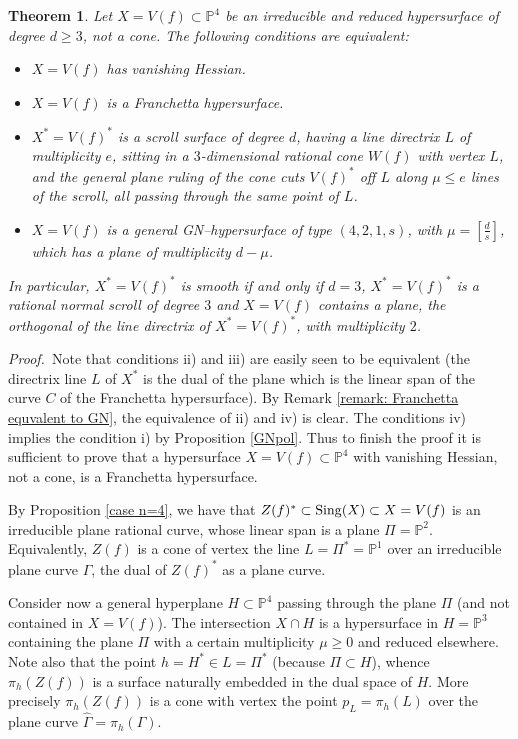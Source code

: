 \documentclass[11pt,a4paper]{amsart}
\newtheorem{theorem}{Theorem}[section]
\newcommand{\bprf}{{\it Proof.~}}
\begin{document}
\begin{theorem}\label{HGNF}
Let $X=V(f)\subset\mathbb{P}^4$ be an irreducible and reduced hypersurface of degree $d\geq 3$, not a cone.
The following conditions are equivalent:
\begin{itemize}
\item [{\rm i)}] $X=V(f)$ has vanishing Hessian. \item [{\rm ii)}]
$X=V(f)$ is a Franchetta hypersurface. \item [{\rm iii)}]
$X^*=V(f)^*$ is a scroll surface of degree $d$, having a line
directrix $L$ of multiplicity $e$, sitting in a $3$-dimensional
rational cone $W(f)$ with vertex $L$, and the general plane ruling
of the cone cuts $V(f)^*$ off $L$ along $\mu \leq e$ lines of the
scroll,  all passing through the same point of $L$. \item [{\rm
iv)}]  $X=V(f)$  is a general GN--hypersurface of type
$(4,2,1,s)$, with $\mu =[\frac{d}{s}]$, which has a plane of
multiplicity $d-\mu$.
\end{itemize}
In particular, $X^*=V(f)^*$ is smooth if and only if  $d=3$, $X^*=V(f)^*$ is a rational normal scroll of degree $3$ and $X=V(f)$ contains a plane, the orthogonal of the line directrix of $X^*=V(f)^*$, with multiplicity $2$.
\end{theorem}

\bprf Note that  conditions ii) and iii) are easily seen to be
equivalent (the directrix line $L$ of $X^*$ is the dual of the
plane which is the linear span of the curve $C$ of the Franchetta
hypersurface). By Remark \ref{remark: Franchetta equvalent to GN},
the equivalence of  ii) and iv) is clear. The conditions iv)
implies the condition i) by Proposition \ref{GNpol}.  Thus to finish  the
proof it is sufficient to prove that a hypersurface
$X=V(f)\subset\mathbb{P}^4$ with vanishing Hessian, not a cone,
is  a Franchetta hypersurface.

By Proposition \ref{case n=4}, we have that $Z(f)^*\subset {\rm
Sing}(X)\subset X=V(f)$ is an irreducible plane rational curve,
whose linear span is a plane $\Pi =\mathbb{P}^2$. Equivalently,
$Z(f)$ is a cone of vertex the line $L=\Pi^*=\mathbb{P}^1$ over an
irreducible plane curve $\Gamma$, the dual of $Z(f)^*$ as a plane
curve.

Consider now   a general hyperplane $H\subset\mathbb{P}^4$
passing through  the plane $\Pi$ (and not contained in $X=V(f)$).
The intersection $X\cap H$ is a hypersurface in $H=\mathbb{P}^3$
containing the plane $\Pi$ with a certain multiplicity $\mu\geq 0$
and reduced elsewhere. Note also that the point $h=H^*\in L=\Pi^*$
(because $\Pi\subset H$), whence $\pi_h(Z(f))$ is a surface
naturally embedded  in the dual space of $H$. More precisely
 $\pi_h(Z(f))$ is a cone  with vertex  the point
$p_L=\pi_h(L)$ over the plane  curve $\hat{\Gamma}=\pi_h(\Gamma)$.
\end{document}
